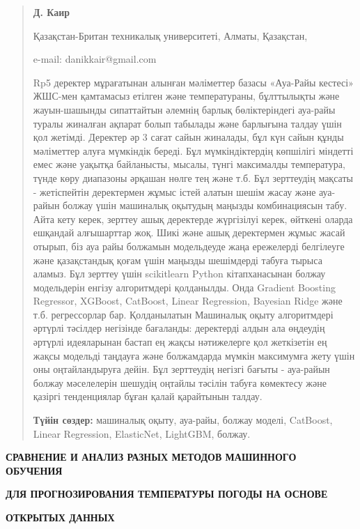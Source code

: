 \begin{quote}
\textbf{Д. Каир}

Қазақстан-Британ техникалық университеті, Алматы, Қазақстан,

e-mail: danikkair@gmail.com

Rp5 деректер мұрағатынан алынған мәліметтер базасы «Ауа-Райы кестесі»
ЖШС-мен қамтамасыз етілген және температураны, бұлттылықты және
жауын-шашынды сипаттайтын әлемнің барлық бөліктеріндегі ауа-райы туралы
жиналған ақпарат болып табылады және барлығына талдау үшін қол жетімді.
Деректер әр 3 сағат сайын жиналады, бұл күн сайын құнды мәліметтер алуға
мүмкіндік береді. Бұл мүмкіндіктердің көпшілігі міндетті емес және
уақытқа байланысты, мысалы, түнгі максималды температура, түнде көру
диапазоны әрқашан нөлге тең және т.б. Бұл зерттеудің мақсаты -
жетіспейтін деректермен жұмыс істей алатын шешім жасау және ауа-райын
болжау үшін машиналық оқытудың маңызды комбинациясын табу. Айта кету
керек, зерттеу ашық деректерде жүргізілуі керек, өйткені оларда ешқандай
алғышарттар жоқ. Шикі және ашық деректермен жұмыс жасай отырып, біз ауа
райы болжамын модельдеуде жаңа ережелерді белгілеуге және қазақстандық
қоғам үшін маңызды шешімдерді табуға тырыса аламыз. Бұл зерттеу үшін
scikitlearn Python кітапханасынан болжау модельдерін енгізу алгоритмдері
қолданылды. Онда Gradient Boosting Regressor, XGBoost, CatBoost, Linear
Regression, Bayesian Ridge және т.б. регрессорлар бар. Қолданылатын
Машиналық оқыту алгоритмдері әртүрлі тәсілдер негізінде бағаланды:
деректерді алдын ала өңдеудің әртүрлі идеяларынан бастап ең жақсы
нәтижелерге қол жеткізетін ең жақсы модельді таңдауға және болжамдарда
мүмкін максимумға жету үшін оны оңтайландыруға дейін. Бұл зерттеудің
негізгі бағыты - ауа-райын болжау мәселелерін шешудің оңтайлы тәсілін
табуға көмектесу және қазіргі тенденциялар бұған қалай қарайтынын
талдау.

\textbf{Түйін сөздер:} машиналық оқыту, ауа-райы, болжау моделі,
CatBoost, Linear Regression, ElasticNet, LightGBM, болжау.
\end{quote}

\textbf{СРАВНЕНИЕ И АНАЛИЗ РАЗНЫХ МЕТОДОВ МАШИННОГО ОБУЧЕНИЯ}

\textbf{ДЛЯ ПРОГНОЗИРОВАНИЯ ТЕМПЕРАТУРЫ ПОГОДЫ НА ОСНОВЕ}

\textbf{ОТКРЫТЫХ ДАННЫХ}

